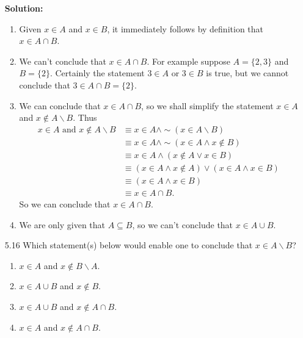 \begin{enumerate}
      \textbf{Solution:}
      
      \begin{enumerate}
         \item Given $x \in A$ and $x \in B$, it immediately follows by
               definition that $x \in A \cap B$.
         \item We can't conclude that $x \in A \cap B$. For example suppose
               $A = \{2, 3\}$ and $B = \{2\}$. Certainly the statement
               $3 \in A$ or $3 \in B$ is true, but we cannot conclude that
               $3 \in A \cap B = \{2\}$.
         \item We can conclude that $x \in A \cap B$, so we shall simplify the 
               statement $x \in A$ and $x \notin A{\backslash}B$. Thus
               \begin{align*}
                  x \in A \text{ and } x \notin A{\backslash}B
                     &\equiv x \in A \land {\sim}(x \in A{\backslash}B) \\
                     &\equiv x \in A \land {\sim}(x \in A \land x \notin B) \\
                     &\equiv x \in A \land (x \notin A \lor x \in B) \\
                     &\equiv (x \in A \land x \notin A) \lor
                             (x \in A \land x \in B) \\
                     &\equiv (x \in A \land x \in B) \\
                     &\equiv x \in A \cap B.
               \end{align*}
               So we can conclude that $x \in A \cap B$.
         \item We are only given that $A \subseteq B$, so we can't conclude that 
               $x \in A \cup B$.
      \end{enumerate}
   \item[5.16] Which statement(s) below would enable one to conclude that
               $x \in A{\backslash}B$?
               \begin{enumerate}
                  \item $x \in A$ and $x \notin B{\backslash}A$.
                  \item $x \in A \cup B$ and $x \notin B$.
                  \item $x \in A \cup B$ and $x \notin A \cap B$.
                  \item $x \in A$ and $x \notin A \cap B$.
               \end{enumerate}
               

\end{enumerate}
